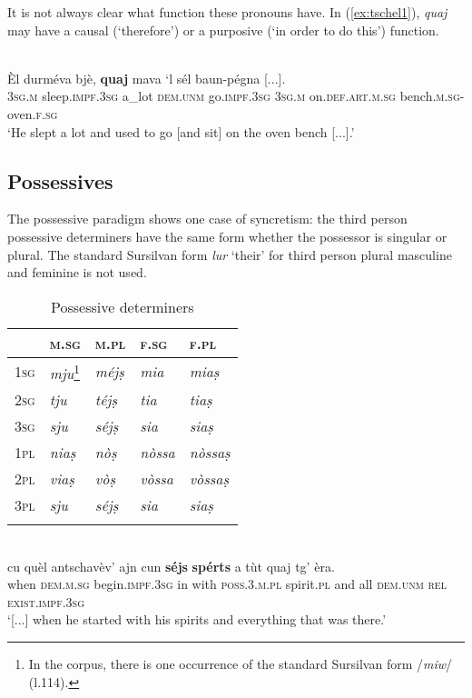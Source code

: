 It is not always clear what function these pronouns have. In (\ref{ex:tschel1}), \textit{quaj} may have a causal (`therefore') or a purposive (`in order to do this') function.

\ea
\label{ex:tschel1}
\\
\gll  Èl durméva bjè, \textbf{quaj} mava `l sél baun-pégna [...].\\
\textsc{3sg.m} sleep.\textsc{impf.3sg} a\_lot \textsc{dem.unm} go.\textsc{impf.3sg} \textsc{3sg.m} on.\textsc{def.art.m.sg} bench.\textsc{m.sg}-oven.\textsc{f.sg}\\
\glt `He slept a lot and used to go [and sit] on the oven bench [...].'
\z

\subsection{Possessives}
The possessive paradigm shows one case of syncretism: the third person possessive determiners have the same form whether the possessor is singular or plural. The standard Sursilvan form \textit{lur} `their' for third person plural masculine and feminine is not used.

\begin{table}
	\caption{Possessive determiners}
	\label{possdet}
	\begin{tabular}{lllll}
		\lsptoprule
		& \textsc{m.sg} & \textsc{m.pl}  & \textsc{f.sg}  & \textsc{f.pl}\\
		\midrule
		\textsc{1sg}  & \textit{mju}\footnote{In the corpus, there is one occurrence of the standard Sursilvan form /\textit{miw}/ (l.114).}  & \textit{méjṣ} &  \textit{mia} & \textit{miaṣ}\\
		\textsc{2sg} & \textit{tju} & \textit{téjṣ} & \textit{tia} & \textit{tiaṣ}\\
		\textsc{3sg} & \textit{sju} & \textit{séjṣ} & \textit{sia} & \textit{siaṣ}\\
		\textsc{1pl} & \textit{niaṣ} & \textit{nòṣ} & \textit{nòssa} & \textit{nòssaṣ}\\
		\textsc{2pl} & \textit{viaṣ}  & \textit{vòṣ} & \textit{vòssa} & \textit{vòssaṣ}\\
		\textsc{3pl}	& \textit{sju} & \textit{séjṣ}  & \textit{sia} & \textit{siaṣ}\\
		\lspbottomrule
	\end{tabular}
\end{table}

\ea
\label{}
\\
\gll [...] cu quèl antschavèv’ ajn cun \textbf{séjs} \textbf{spérts} a tùt quaj tg’ èra.\\
{} when \textsc{dem.m.sg} begin.\textsc{impf.3sg} in with \textsc{poss.3.m.pl} spirit.\textsc{pl}  and all \textsc{dem.unm} \textsc{rel} \textsc{exist.impf.3sg}  \\
\glt `[...] when he started with his spirits and everything that was there.'
\z

